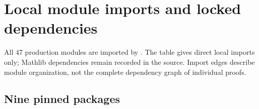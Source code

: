 \section{Local module imports and locked dependencies}
\label{sec:imports}
All 47 production modules are imported by . The table gives direct local imports only; Mathlib dependencies remain recorded in the source. Import edges describe module organization, not the complete dependency graph of individual proofs.

\subsection{Nine pinned packages}


